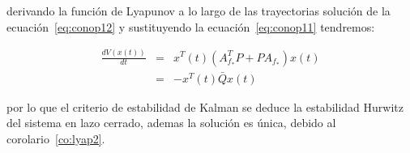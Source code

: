         derivando la función de Lyapunov a lo largo de las trayectorias solución de la ecuación~\ref{eq:conop12} y sustituyendo la ecuación~\ref{eq:conop11} tendremos:

        \begin{eqnarray*}
            \frac{dV(x(t))}{dt} & = & x^T(t)(A_{f_*}^T P + P A_{f_*})x(t) \\
             & = & -x^T(t) \bar{Q} x(t)
        \end{eqnarray*}

        por lo que el criterio de estabilidad de Kalman se deduce la estabilidad Hurwitz del sistema en lazo cerrado, ademas la solución es única, debido al corolario~\ref{co:lyap2}.
